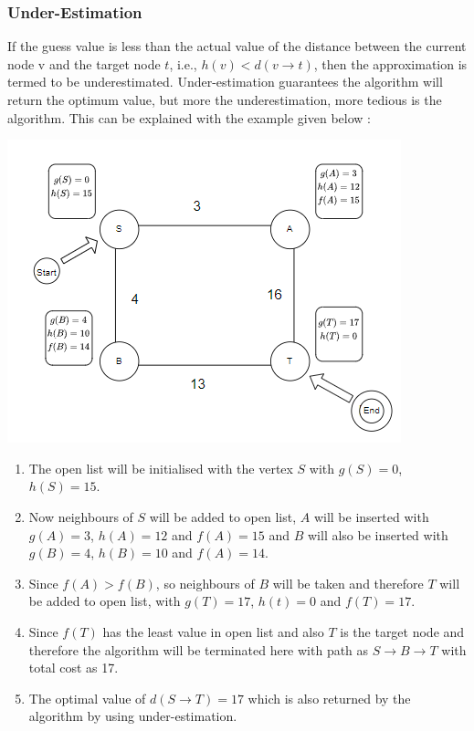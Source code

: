 \documentclass{article}
\theoremstyle{definition}
\begin{document}
\subsubsection{Under-Estimation}
If the guess value is less than the actual value of the distance between the current node v and the target node $t$, i.e., $h(v) < d(v \rightarrow t)$, then the approximation is termed to be underestimated. Under-estimation guarantees the algorithm will return the optimum value, but more the underestimation, more tedious is the algorithm. This can be explained with the example given below :
\begin{center}
    \includegraphics[scale = 0.9]{Under-Estimation.png}
\end{center}
\begin{enumerate}
    \item The open list will be initialised with the vertex $S$ with $g(S)=0$, $h(S)=15$.
    \item Now neighbours of $S$ will be added to open list, $A$ will be inserted with $g(A) = 3$, $h(A) = 12$ and $f(A) = 15$ and $B$ will also be inserted with $g(B) = 4$, $h(B) = 10$ and $f(A) = 14$. 
    \item Since $f(A) > f(B)$, so neighbours of $B$ will be taken and therefore $T$ will be added to open list, with $g(T) = 17$, $h(t) = 0$ and $f(T) = 17$.
    \item Since $f(T)$ has the least value in open list and also $T$ is the target node and therefore the algorithm will be terminated here with path as $S \longrightarrow B \longrightarrow  T$ with total cost as 17.
    \item The optimal value of $d(S \longrightarrow T) = 17$ which is also returned by the algorithm by using under-estimation.
\end{enumerate}
\end{document}
